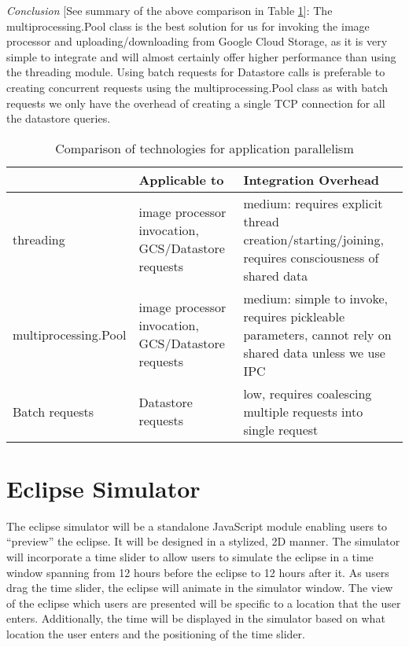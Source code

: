 \documentclass[10pt, onecolumn, draftclsnofoot, letterpaper, compsoc]{IEEEtran}
\begin{document}
\textit{Conclusion} [See summary of the above comparison in Table \ref{table:bret3}]:
The multiprocessing.Pool class is the best solution for us 
for invoking the image processor and uploading/downloading from Google Cloud 
Storage, as it is very simple to integrate and will almost certainly offer 
higher performance than using the threading module. Using batch requests for 
Datastore calls is preferable to creating concurrent requests using the 
multiprocessing.Pool class as with batch requests we only have the overhead 
of creating a single TCP connection for all the datastore queries.

\begin{table}[h]
\centering
\caption{Comparison of technologies for application parallelism}
\begin{tabular}{|p{4.2cm}|p{4.2cm}|p{4.2cm}|}
\cline{3-3}
\hline

 & Applicable to & Integration Overhead \\ \hline

threading & image processor invocation, GCS/Datastore requests 
& medium: requires explicit thread creation/starting/joining, 
requires consciousness of shared data \\ \hline

multiprocessing.Pool & image processor invocation, GCS/Datastore requests
& medium: simple to invoke, requires pickleable parameters, cannot rely 
on shared data unless we use IPC \\ \hline

Batch requests & Datastore requests & low, requires coalescing multiple 
requests into single request  \\ \hline

\end{tabular}
\label{table:bret3}
\end{table}

\section{Eclipse Simulator}
The eclipse simulator will be a standalone JavaScript module enabling users to
“preview” the eclipse. It will be designed in a stylized, 2D manner.
The simulator will incorporate a time slider to allow users to simulate
the eclipse in a time window spanning from 12 hours before the eclipse to 12
hours after it. As users drag the time slider, the eclipse will animate in the
simulator window. The view of the eclipse which users are presented will be 
specific to a location that the user enters. Additionally, the time will be
displayed in the simulator based on what location the user enters and the
positioning of the time slider.



\end{document}
